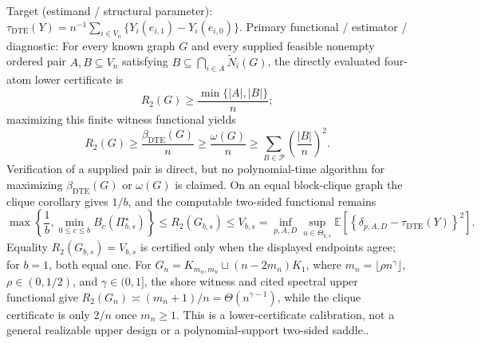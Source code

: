 \documentclass{article}
\begin{document}
Target (estimand / structural parameter): \(\tau_{\mathrm{DTE}}(Y)=n^{-1}\sum_{i\in V_n}\{Y_i(e_{i,1})-Y_i(e_{i,0})\}\).
Primary functional / estimator / diagnostic: For every known graph \(G\) and every supplied feasible nonempty ordered pair \(A,B\subseteq V_n\) satisfying \(B\subseteq\bigcap_{i\in A}\widetilde N_i(G)\), the directly evaluated four-atom lower certificate is
\[
R_2(G)\geq\frac{\min\{|A|,|B|\}}{n};
\]
maximizing this finite witness functional yields
\[
R_2(G)\geq\frac{\beta_{\mathrm{DTE}}(G)}n\geq\frac{\omega(G)}n\geq\sum_{B\in\mathcal P}\left(\frac{|B|}{n}\right)^2.
\]
Verification of a supplied pair is direct, but no polynomial-time algorithm for maximizing \(\beta_{\mathrm{DTE}}(G)\) or \(\omega(G)\) is claimed.  On an equal block-clique graph the clique corollary gives \(1/b\), and the computable two-sided functional remains
\[
\max\left\{\frac1b,\min_{0\leq c\leq b}B_c(\Pi_{b,s}^{\star})\right\}
\leq R_2(G_{b,s})\leq V_{b,s}
=\inf_{p,A,D}\sup_{u\in\Theta_{b,s}}\mathbb E\!\left[\left\{\delta_{p,A,D}-\tau_{\mathrm{DTE}}(Y)\right\}^2\right].
\]
Equality \(R_2(G_{b,s})=V_{b,s}\) is certified only when the displayed endpoints agree; for \(b=1\), both equal one.  For \(G_n=K_{m_n,m_n}\sqcup(n-2m_n)K_1\), where \(m_n=\lfloor\rho n^{\gamma}\rfloor\), \(\rho\in(0,1/2)\), and \(\gamma\in(0,1]\), the shore witness and cited spectral upper functional give \(R_2(G_n)\asymp(m_n+1)/n=\Theta(n^{\gamma-1})\), while the clique certificate is only \(2/n\) once \(m_n\geq1\).  This is a lower-certificate calibration, not a general realizable upper design or a polynomial-support two-sided saddle..
\end{document}
